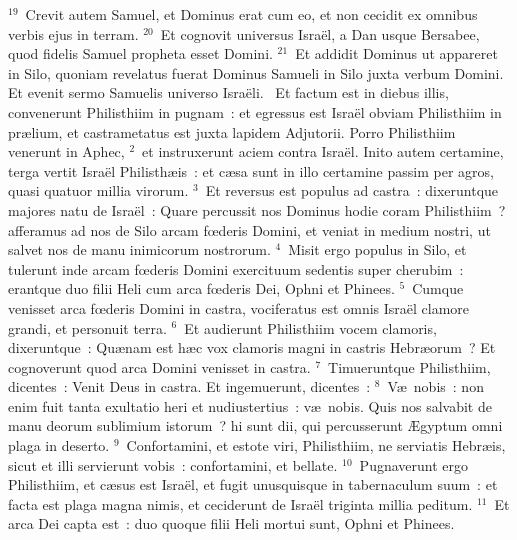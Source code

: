 ${}^{19}$~Crevit autem Samuel, et Dominus erat cum eo, et non cecidit ex omnibus verbis ejus in terram.
${}^{20}$~Et cognovit universus Isra\"el, a Dan usque Bersabee, quod fidelis Samuel propheta esset Domini.
${}^{21}$~Et addidit Dominus ut appareret in Silo, quoniam revelatus fuerat Dominus Samueli in Silo juxta verbum Domini. Et evenit sermo Samuelis universo Isra\"eli.
~Et factum est in diebus illis, convenerunt Philisthiim in pugnam~: et egressus est Isra\"el obviam Philisthiim in pr\ae lium, et castrametatus est juxta lapidem Adjutorii. Porro Philisthiim venerunt in Aphec,
${}^{2}$~et instruxerunt aciem contra Isra\"el. Inito autem certamine, terga vertit Isra\"el Philisth\ae is~: et c\ae sa sunt in illo certamine passim per agros, quasi quatuor millia virorum.
${}^{3}$~Et reversus est populus ad castra~: dixeruntque majores natu de Isra\"el~: Quare percussit nos Dominus hodie coram Philisthiim~? afferamus ad nos de Silo arcam fœderis Domini, et veniat in medium nostri, ut salvet nos de manu inimicorum nostrorum.
${}^{4}$~Misit ergo populus in Silo, et tulerunt inde arcam fœderis Domini exercituum sedentis super cherubim~: erantque duo filii Heli cum arca fœderis Dei, Ophni et Phinees.
${}^{5}$~Cumque venisset arca fœderis Domini in castra, vociferatus est omnis Isra\"el clamore grandi, et personuit terra.
${}^{6}$~Et audierunt Philisthiim vocem clamoris, dixeruntque~: Qu\ae nam est h\ae c vox clamoris magni in castris Hebr\ae orum~? Et cognoverunt quod arca Domini venisset in castra.
${}^{7}$~Timueruntque Philisthiim, dicentes~: Venit Deus in castra. Et ingemuerunt, dicentes~:
${}^{8}$~V\ae\ nobis~: non enim fuit tanta exultatio heri et nudiustertius~: v\ae\ nobis. Quis nos salvabit de manu deorum sublimium istorum~? hi sunt dii, qui percusserunt \AE gyptum omni plaga in deserto.
${}^{9}$~Confortamini, et estote viri, Philisthiim, ne serviatis Hebr\ae is, sicut et illi servierunt vobis~: confortamini, et bellate.
${}^{10}$~Pugnaverunt ergo Philisthiim, et c\ae sus est Isra\"el, et fugit unusquisque in tabernaculum suum~: et facta est plaga magna nimis, et ceciderunt de Isra\"el triginta millia peditum.
${}^{11}$~Et arca Dei capta est~: duo quoque filii Heli mortui sunt, Ophni et Phinees.


